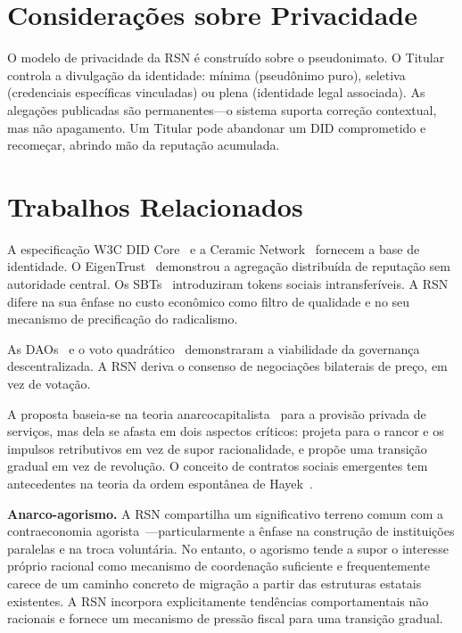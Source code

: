 \documentclass[11pt,a4paper,twocolumn]{article}
\begin{document}
\section{Considerações sobre Privacidade}

O modelo de privacidade da RSN é construído sobre o pseudonimato. O Titular controla a divulgação da identidade: mínima (pseudônimo puro), seletiva (credenciais específicas vinculadas) ou plena (identidade legal associada). As alegações publicadas são permanentes---o sistema suporta correção contextual, mas não apagamento. Um Titular pode abandonar um DID comprometido e recomeçar, abrindo mão da reputação acumulada.

\section{Trabalhos Relacionados}

A especificação W3C DID Core~\cite{did2022} e a Ceramic Network~\cite{ceramic2023} fornecem a base de identidade. O EigenTrust~\cite{kamvar2003} demonstrou a agregação distribuída de reputação sem autoridade central. Os SBTs~\cite{weyl2022} introduziram tokens sociais intransferíveis. A RSN difere na sua ênfase no custo econômico como filtro de qualidade e no seu mecanismo de precificação do radicalismo.

As DAOs~\cite{buterin2014} e o voto quadrático~\cite{buterin2019} demonstraram a viabilidade da governança descentralizada. A RSN deriva o consenso de negociações bilaterais de preço, em vez de votação.

A proposta baseia-se na teoria anarcocapitalista~\cite{rothbard1973,hoppe2001} para a provisão privada de serviços, mas dela se afasta em dois aspectos críticos: projeta para o rancor e os impulsos retributivos em vez de supor racionalidade, e propõe uma transição gradual em vez de revolução. O conceito de contratos sociais emergentes tem antecedentes na teoria da ordem espontânea de Hayek~\cite{hayek1973}.

\textbf{Anarco-agorismo.} A RSN compartilha um significativo terreno comum com a contraeconomia agorista~\cite{konkin2006}---particularmente a ênfase na construção de instituições paralelas e na troca voluntária. No entanto, o agorismo tende a supor o interesse próprio racional como mecanismo de coordenação suficiente e frequentemente carece de um caminho concreto de migração a partir das estruturas estatais existentes. A RSN incorpora explicitamente tendências comportamentais não racionais e fornece um mecanismo de pressão fiscal para uma transição gradual.
\end{document}
